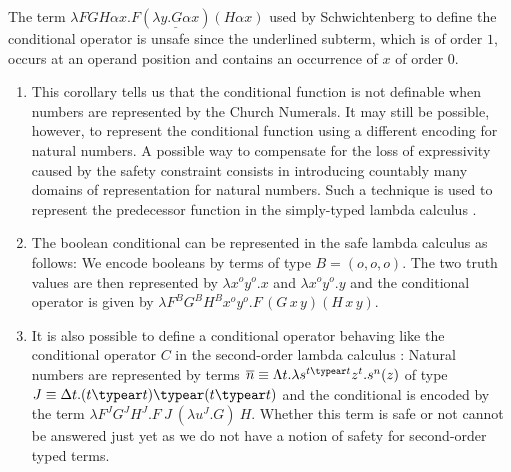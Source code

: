 \begin{example}
The term $\lambda F G H \alpha x . F ( \underline{\lambda y . G
\alpha x} ) (H \alpha x)$ used by Schwichtenberg
\cite{citeulike:622637} to define the conditional operator is unsafe
since the underlined subterm, which is of order $1$, occurs at an
operand position and contains an occurrence of $x$ of order $0$.
\end{example}

\begin{remark} \hfill
\begin{enumerate}
\item This corollary tells us that the conditional function is not
definable when numbers are represented by the Church Numerals.
It may still be possible, however, to represent the conditional
function using a different encoding for natural numbers. A
possible way to compensate for the loss of expressivity caused
by the safety constraint consists in introducing countably many
domains of representation for natural numbers. Such
a technique is used to represent the predecessor function in
the simply-typed lambda calculus
\cite{DBLP:journals/jacm/FortuneLO83}.

\item The boolean conditional can be represented in the safe
lambda calculus as follows: We encode booleans by terms of type
$B=(o,o,o)$. The two truth values are then represented by
$\lambda x^o y^o.x$ and $\lambda x^o y^o.y$ and the conditional operator is given by $\lambda F^B G^B H^B x^o y^o. F\,(G\,x\,y) (H\,x\,y)$.

\item It is also possible to define a conditional operator behaving like
the conditional operator $C$ in the second-order lambda calculus
\cite{DBLP:journals/jacm/FortuneLO83}: Natural numbers are
represented by terms $\overline{n} \equiv \Lambda t.\lambda
s^{t\typear t} z^t.s^n(z)$ of type $J \equiv \Delta t.(t\typear
t) \typear (t \typear t)$ and the conditional is encoded by the
term $\lambda F^J G^J H^J.F~J~(\lambda u^J . G)~H$. Whether this
term is safe or not cannot be answered just yet as we do not
have a notion of safety for second-order typed terms.
\end{enumerate}
\end{remark}





\newcommand{\zaioncencode}{\underline} %

